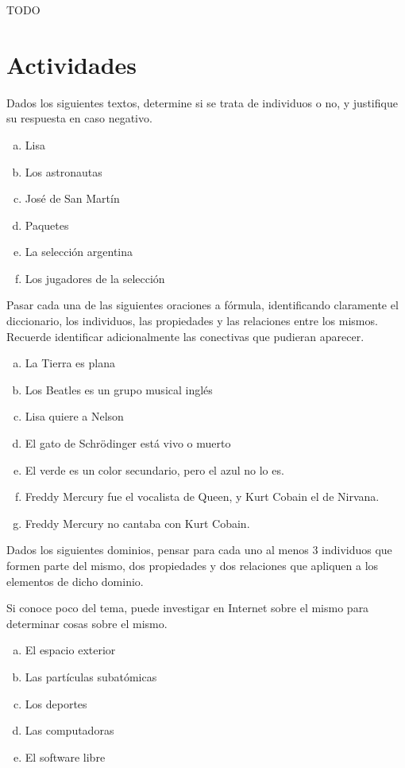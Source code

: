 TODO

\section{Actividades}
\label{chap:logica_predicados:sec:actividades}

\begin{exercise}
    Dados los siguientes textos, determine si se trata de individuos o no, y justifique su respuesta en caso negativo.

    \begin{enumerate}[a)]
        \item Lisa
        \item Los astronautas
        \item José de San Martín
        \item Paquetes
        \item La selección argentina
        \item Los jugadores de la selección
    \end{enumerate}
\end{exercise}

\begin{exercise}
    Pasar cada una de las siguientes oraciones a fórmula, identificando claramente el diccionario, los individuos, las propiedades y las relaciones entre los mismos. Recuerde identificar adicionalmente las conectivas que pudieran aparecer.
    \begin{enumerate}[a)]
        \item La Tierra es plana
        \item Los Beatles es un grupo musical inglés
        \item Lisa quiere a Nelson
        \item El gato de Schrödinger está vivo o muerto
        \item El verde es un color secundario, pero el azul no lo es.
        \item Freddy Mercury fue el vocalista de Queen, y Kurt Cobain el de Nirvana.
        \item Freddy Mercury no cantaba con Kurt Cobain.
    \end{enumerate}
\end{exercise}

\begin{exercise}
    Dados los siguientes dominios, pensar para cada uno al menos 3 individuos que formen parte del mismo, dos propiedades y dos relaciones que apliquen a los elementos de dicho dominio.

    Si conoce poco del tema, puede investigar en Internet sobre el mismo para determinar cosas sobre el mismo.

    \begin{enumerate}[a)]
        \item El espacio exterior
        \item Las partículas subatómicas
        \item Los deportes
        \item Las computadoras
        \item El software libre
    \end{enumerate}
\end{exercise}

